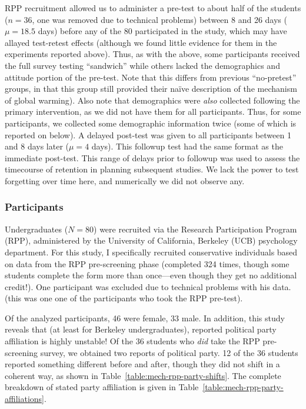 RPP recruitment allowed us to administer a pre-test to about half of the
students ($n=36$, one was removed due to technical problems) between 8 and 26
days ($\mu=18.5$ days) before any of the 80 participated in the study, which may
have allayed test-retest effects (although we found little evidence for them in
the experiments reported above).  Thus, as with the above, some participants
received the full survey testing ``sandwich'' while others lacked the
demographics and attitude portion of the pre-test. Note that this differs from
previous “no-pretest” groups, in that this group still provided their naïve
description of the mechanism of global warming). Also note that demographics
were \emph{also} collected following the primary intervention, as we did not
have them for all participants. Thus, for some participants, we collected
some demographic information twice (some of which is reported on below).
A delayed post-test was given to all participants between 1 and 8 days later
($\mu=4$ days). This followup test had the same format as the immediate
post-test. This range of delays prior to followup was used to assess the
timecourse of retention in planning subsequent studies. We lack the power to
test forgetting over time here, and numerically we did not observe any.

\subsubsection{Participants}

Undergraduates ($N=80$) were recruited via the Research Participation Program
(RPP), administered by the University of California, Berkeley (UCB) psychology
department. For this study, I specifically recruited conservative individuals
based on data from the RPP pre-screening phase (completed 324 times, though some
students complete the form more than once---even though they get no additional
credit!). One participant was excluded due to technical problems with his data.
(this was one one of the participants who took the RPP pre-test).

Of the analyzed participants, 46 were female, 33 male. In addition, this study
reveals that (at least for Berkeley undergraduates), reported political party
affiliation is highly unstable! Of the 36 students who \emph{did} take the
RPP pre-screening survey, we obtained two reports of political party. 12 of the
36 students reported something different before and after, though they did not
shift in a coherent way, as shown in Table~\ref{table:mech-rpp-party-shifts}.
The complete breakdown of stated party affiliation is given in
Table~\ref{table:mech-rpp-party-affiliations}.

